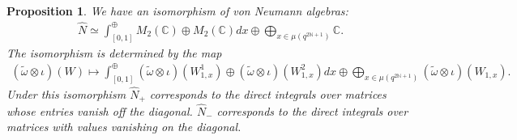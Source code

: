 \documentclass[pdftex]{sigma}
\numberwithin{equation}{section}
\newtheorem{prop}[thm]{Proposition}
\theoremstyle{definition}
\begin{document}
\begin{prop}
We have an isomorphism of von Neumann algebras:
\begin{gather}\label{EqnIsoVNA}
 \hat{N} \simeq \int_{[0,1]}^\oplus M_2(\mathbb{C}) \oplus M_2(\mathbb{C}) dx \oplus \bigoplus_{x \in \mu(q^{2\mathbb{N}+1})} \mathbb{C}.
\end{gather}
The isomorphism is determined by the map
\begin{gather}\label{EqnVNAIso}
(\tilde{\omega} \otimes \iota)(W) \mapsto \int_{[0,1]}^\oplus (\tilde{\omega} \otimes \iota)(W_{1,x}^1) \oplus (\tilde{\omega} \otimes \iota)(W_{1,x}^2)  dx \oplus \bigoplus_{x \in \mu(q^{2\mathbb{N}+1})}  (\tilde{\omega} \otimes \iota)(W_{1,x}) .
\end{gather}
Under this isomorphism $\hat{N}_+$ corresponds to the direct integrals over matrices whose entries vanish off the diagonal. $\hat{N}_-$ corresponds to the direct integrals over matrices with values vanishing on the diagonal.
\end{prop}
\end{document}
